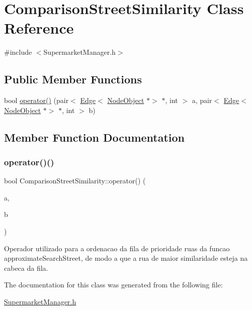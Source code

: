\hypertarget{class_comparison_street_similarity}{}\section{Comparison\+Street\+Similarity Class Reference}
\label{class_comparison_street_similarity}


{\ttfamily \#include $<$Supermarket\+Manager.\+h$>$}

\subsection*{Public Member Functions}
\begin{DoxyCompactItemize}
\item 
bool \hyperlink{class_comparison_street_similarity_a6f94e67250db423dcac1d1070facc60c}{operator()} (pair$<$ \hyperlink{class_edge}{Edge}$<$ \hyperlink{class_node_object}{Node\+Object} $\ast$$>$ $\ast$, int $>$ a, pair$<$ \hyperlink{class_edge}{Edge}$<$ \hyperlink{class_node_object}{Node\+Object} $\ast$$>$ $\ast$, int $>$ b)
\end{DoxyCompactItemize}


\subsection{Member Function Documentation}
\mbox{\label{class_comparison_street_similarity_a6f94e67250db423dcac1d1070facc60c}} 
\subsubsection{\texorpdfstring{operator()()}{operator()()}}
{\footnotesize\ttfamily bool Comparison\+Street\+Similarity\+::operator() (\begin{DoxyParamCaption}\item[{pair$<$ \hyperlink{class_edge}{Edge}$<$ \hyperlink{class_node_object}{Node\+Object} $\ast$$>$ $\ast$, int $>$}]{a,  }\item[{pair$<$ \hyperlink{class_edge}{Edge}$<$ \hyperlink{class_node_object}{Node\+Object} $\ast$$>$ $\ast$, int $>$}]{b }\end{DoxyParamCaption})\hspace{0.3cm}{\ttfamily [inline]}}

Operador utilizado para a ordenacao da fila de prioridade ruas da funcao approximate\+Search\+Street, de modo a que a rua de maior similaridade esteja na cabeca da fila. 

The documentation for this class was generated from the following file\+:\begin{DoxyCompactItemize}
\item 
\hyperlink{_supermarket_manager_8h}{Supermarket\+Manager.\+h}\end{DoxyCompactItemize}
